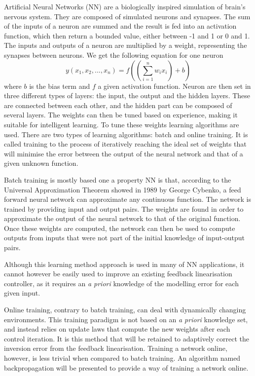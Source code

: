 Artificial Neural Networks (NN) are a biologically inspired simulation of brain's nervous system. They are composed of simulated neurons and synapses. The sum of the inputs of a neuron are summed and the result is fed into an activation function, which then return a bounded value, either between -1 and 1 or 0 and 1. The inputs and outputs of a neuron are multiplied by a weight, representing the synapses between neurons. We get the following equation for one neuron
\begin{equation}
y(x_1,x_2,...,x_n)=f((\sum ^n_{i=1} w_i x_i)+b)
\end{equation}
where $b$ is the bias term and $f$ a given activation function. Neuron are then set in three different types of layers: the input, the output and the hidden layers. These are connected between each other, and the hidden part can be composed of several layers. The weights can then be tuned based on experience, making it suitable for intelligent learning. To tune these weights learning algorithms are used. There are two types of learning algorithms: batch and online training. It is called training to the process of iteratively reaching the ideal set of weights that will minimise the error between the output of the neural network and that of a given unknown function.

Batch training is mostly based one a property NN is that, according to the Universal Approximation Theorem showed in 1989 by George Cybenko, a feed forward neural network can approximate any continuous function. The network is trained by providing input and output pairs. The weights are found in order to approximate the output of the neural network to that of the original function. Once these weights are computed, the network can then be used to compute outputs from inputs that were not part of the initial knowledge of input-output pairs.

Although this learning method approach is used in many of NN applications, it cannot however be easily used to improve an existing feedback linearisation  controller, as it requires an \textit{a priori} knowledge of the modelling error for each given input.

Online training, contrary to batch training, can deal with dynamically changing environments. This training paradigm is not based on an \textit{a priori} knowledge set, and instead relies on update laws that compute the new weights after each control iteration. It is this method that will be retained to adaptively correct the inversion error from the feedback linearisation. Training a network online, however, is less trivial when compared to batch training. An algorithm named backpropagation will be presented to provide a way of training a network online.  


